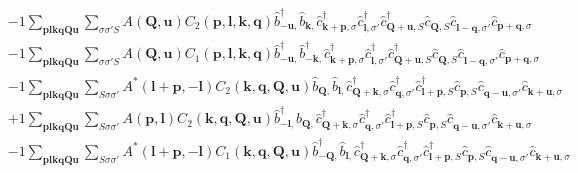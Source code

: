 \begin{align*}
	&-1 \sum_{ \mathbf{p} \mathbf{l} \mathbf{k} \mathbf{q} \mathbf{Q} \mathbf{u} } \sum_{ \sigma \sigma' S } A( \mathbf{Q}, \mathbf{u} )  C_2( \mathbf{p}, \mathbf{l}, \mathbf{k}, \mathbf{q} )   \hat{b}_{ -\mathbf{u}, }^\dagger  \hat{b}_{ \mathbf{k}, }^{\phantom{\dagger}} \hat{c}_{ \mathbf{k}+\mathbf{p}, \sigma }^\dagger  \hat{c}_{ \mathbf{l}, \sigma' }^\dagger  \hat{c}_{ \mathbf{Q}+\mathbf{u}, S }^\dagger  \hat{c}_{ \mathbf{Q}, S }^{\phantom{\dagger}} \hat{c}_{ \mathbf{l}-\mathbf{q}, \sigma' }^{\phantom{\dagger}} \hat{c}_{ \mathbf{p}+\mathbf{q}, \sigma }^{\phantom{\dagger}}  \\
	&-1 \sum_{ \mathbf{p} \mathbf{l} \mathbf{k} \mathbf{q} \mathbf{Q} \mathbf{u} } \sum_{ \sigma \sigma' S } A( \mathbf{Q}, \mathbf{u} )  C_1( \mathbf{p}, \mathbf{l}, \mathbf{k}, \mathbf{q} )   \hat{b}_{ -\mathbf{u}, }^\dagger  \hat{b}_{ -\mathbf{k}, }^\dagger  \hat{c}_{ \mathbf{k}+\mathbf{p}, \sigma }^\dagger  \hat{c}_{ \mathbf{l}, \sigma' }^\dagger  \hat{c}_{ \mathbf{Q}+\mathbf{u}, S }^\dagger  \hat{c}_{ \mathbf{Q}, S }^{\phantom{\dagger}} \hat{c}_{ \mathbf{l}-\mathbf{q}, \sigma' }^{\phantom{\dagger}} \hat{c}_{ \mathbf{p}+\mathbf{q}, \sigma }^{\phantom{\dagger}}  \\
	&-1 \sum_{ \mathbf{p} \mathbf{l} \mathbf{k} \mathbf{q} \mathbf{Q} \mathbf{u} } \sum_{ S \sigma \sigma' } A^*( \mathbf{l}+\mathbf{p}, -\mathbf{l} )  C_2( \mathbf{k}, \mathbf{q}, \mathbf{Q}, \mathbf{u} )   \hat{b}_{ \mathbf{Q}, }^{\phantom{\dagger}} \hat{b}_{ \mathbf{l}, }^{\phantom{\dagger}} \hat{c}_{ \mathbf{Q}+\mathbf{k}, \sigma }^\dagger  \hat{c}_{ \mathbf{q}, \sigma' }^\dagger  \hat{c}_{ \mathbf{l}+\mathbf{p}, S }^\dagger  \hat{c}_{ \mathbf{p}, S }^{\phantom{\dagger}} \hat{c}_{ \mathbf{q}-\mathbf{u}, \sigma' }^{\phantom{\dagger}} \hat{c}_{ \mathbf{k}+\mathbf{u}, \sigma }^{\phantom{\dagger}}  \\
	&+1 \sum_{ \mathbf{p} \mathbf{l} \mathbf{k} \mathbf{q} \mathbf{Q} \mathbf{u} } \sum_{ S \sigma \sigma' } A( \mathbf{p}, \mathbf{l} )  C_2( \mathbf{k}, \mathbf{q}, \mathbf{Q}, \mathbf{u} )   \hat{b}_{ -\mathbf{l}, }^\dagger  \hat{b}_{ \mathbf{Q}, }^{\phantom{\dagger}} \hat{c}_{ \mathbf{Q}+\mathbf{k}, \sigma }^\dagger  \hat{c}_{ \mathbf{q}, \sigma' }^\dagger  \hat{c}_{ \mathbf{l}+\mathbf{p}, S }^\dagger  \hat{c}_{ \mathbf{p}, S }^{\phantom{\dagger}} \hat{c}_{ \mathbf{q}-\mathbf{u}, \sigma' }^{\phantom{\dagger}} \hat{c}_{ \mathbf{k}+\mathbf{u}, \sigma }^{\phantom{\dagger}}  \\
	&-1 \sum_{ \mathbf{p} \mathbf{l} \mathbf{k} \mathbf{q} \mathbf{Q} \mathbf{u} } \sum_{ S \sigma \sigma' } A^*( \mathbf{l}+\mathbf{p}, -\mathbf{l} )  C_1( \mathbf{k}, \mathbf{q}, \mathbf{Q}, \mathbf{u} )   \hat{b}_{ -\mathbf{Q}, }^\dagger  \hat{b}_{ \mathbf{l}, }^{\phantom{\dagger}} \hat{c}_{ \mathbf{Q}+\mathbf{k}, \sigma }^\dagger  \hat{c}_{ \mathbf{q}, \sigma' }^\dagger  \hat{c}_{ \mathbf{l}+\mathbf{p}, S }^\dagger  \hat{c}_{ \mathbf{p}, S }^{\phantom{\dagger}} \hat{c}_{ \mathbf{q}-\mathbf{u}, \sigma' }^{\phantom{\dagger}} \hat{c}_{ \mathbf{k}+\mathbf{u}, \sigma }^{\phantom{\dagger}} 
\end{align*}
